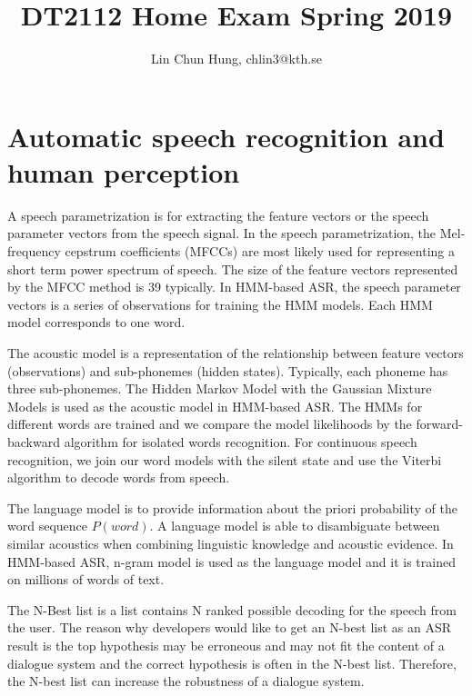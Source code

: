 \documentclass[12pt]{article}
\newenvironment{problem}[2][Problem]{\begin{trivlist}
\item[\hskip \labelsep {\bfseries #1}\hskip \labelsep {\bfseries #2.}]}{\end{trivlist}}
\begin{document}
\title{DT2112 Home Exam Spring 2019}
\author{Lin Chun Hung, chlin3@kth.se}
\maketitle

\section{Automatic speech recognition and human perception}
\begin{problem}{1.1}
    A speech parametrization is for extracting the feature vectors or the speech
    parameter vectors from the speech signal. 
    In the speech parametrization,
    the Mel-frequency cepstrum coefficients (MFCCs) are most likely used for 
    representing a short term power spectrum of speech. 
    The size of the feature vectors represented by the MFCC method is 39 typically.
    In HMM-based ASR, the speech parameter vectors is a series of observations 
    for training the HMM models. Each HMM model 
    corresponds to one word.

    The acoustic model is a representation of the relationship between feature 
    vectors (observations) and sub-phonemes (hidden states).
    Typically, each phoneme has three sub-phonemes. 
    The Hidden Markov Model with the Gaussian Mixture Models is used as 
    the acoustic model in HMM-based ASR. 
    The HMMs for different words are trained and we compare the model likelihoods
    by the forward-backward algorithm for isolated words recognition. 
    For continuous speech recognition, we join our word models with the silent 
    state and use the Viterbi algorithm to decode words from speech.

    The language model is to provide information about the priori probability of
    the word sequence $P(word)$. 
    A language model is able to disambiguate between similar acoustics when 
    combining linguistic knowledge and acoustic evidence.
    In HMM-based ASR, n-gram model is used as the language model and 
    it is trained on millions of words of text.

    The N-Best list is a list contains N ranked possible decoding for the speech
    from the user.
    The reason why developers would like to get an N-best list as an ASR result
    is the top hypothesis may be erroneous and may not fit the content of a
    dialogue system and the correct hypothesis is often in the N-best list.
    Therefore, the N-best list can increase the robustness of a dialogue system.
\end{problem}
\end{document}
